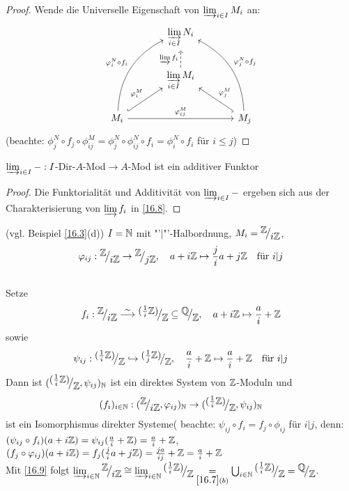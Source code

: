 \begin{proof}
	Wende die Universelle Eigenschaft von $\varinjlim_{i\in I} M_i$ an:
	$$\begin{tikzcd}[column sep = large]
	& \varinjlim\limits_{i\in I} N_i & \\
	& \varinjlim\limits_{i\in I} M_i \arrow[dashed]{u}{\varinjlim f_i}& \\
	M_i \arrow[hook]{ur}{\phi_i^M} \arrow[bend left]{uur}{\phi_i^N \circ f_i} \arrow{rr}{\phi_{ij}^M} & & M_j \arrow[swap, hook]{ul}{\phi_j^M} \arrow[bend right, swap]{uul}{\phi_j^N \circ f_j}
	\end{tikzcd}$$
	(beachte: $\phi_j^N \circ f_j \circ \phi_{ij}^M = \phi_j^N \circ \phi_{ij}^N \circ f_i = \phi_i^N \circ f_i$ für $i\leq j$)
\end{proof}
\begin{fo} \label{16.9}
	$\varinjlim_{i\in I}-:I$-Dir-$A$-Mod$\to A$-Mod ist ein additiver Funktor
\end{fo}
\begin{proof}
	Die Funktorialität und Additivität von $\varinjlim_{i\in I}-$ ergeben sich aus der Charakterisierung von $\varinjlim f_i$ in \ref{16.8}.
\end{proof}
\begin{bsp} \label{16.10}
	(vgl. Beispiel \ref{16.3}(d)) $I=\mathbb{N}$ mit "'$\big | $"'-Halbordnung, $M_i = \QR{\Z}{i\Z}$,$$\phi_{ij}: \QR{\Z}{i\Z} \to \QR{\Z}{j\Z}, \quad  a+i\Z \mapsto \frac{j}{i}a + j \Z \quad \text{für} \ i|j$$\\
	Setze $$f_i: \QR{\Z}{i\Z} \overset{\sim}{\longrightarrow} \QR{(\frac{1}{i} \Z)}{\Z} \subseteq \QR{\Q}{\Z}, \quad a+i \Z \mapsto \frac{a}{i} + \Z $$ sowie $$ \psi_{ij}: \QR{(\frac{1}{i} \Z)}{\Z} \hookrightarrow \QR{(\frac{1}{j} \Z)}{\Z}, \quad \frac{a}{i} + \Z \mapsto \frac{a}{i} + \Z  \quad \text{für} \ i|j$$ 
	Dann ist $ (\QR{(\frac{1}{i} \Z)}{\Z}, \psi_{ij})_{\N} $ ist ein direktes System von $\mathbb{Z}$-Moduln und $$ (f_i)_{i \in \N} : (\QR{\Z}{i \Z}, \phi_{ij})_{\N} \to (\QR{(\frac{1}{i} \Z)}{\Z}, \psi_{ij})_{\N} $$ ist ein Isomorphismus direkter Systeme( beachte: $\psi_{ij} \circ f_i = f_j \circ \phi_{ij} $ für $i|j$, denn: \\
	$(\psi_{ij} \circ f_i)(a + i\mathbb{Z}) = \psi_{ij}(\frac{a}{i} + \mathbb{Z}) = \frac{a}{i} + \mathbb{Z}$,\\
	$(f_j \circ \varphi_{ij})(a + i\mathbb{Z}) = f_j(\frac{j}{i} a + j\mathbb{Z}) = \frac{ja}{ij} + \mathbb{Z} = \frac{a}{i} + \mathbb{Z}$\\
	Mit \ref{16.9} folgt $\varinjlim_{i\in \N} \QR{\Z}{i \Z} \cong \varinjlim_{i\in \N} \QR{(\frac{1}{i} \Z)}{\Z} \underset{\ref{16.7}(b)}{=} \bigcup_{i\in \N} \QR{(\frac{1}{i} \Z)}{\Z} = \QR{\Q}{\Z}$.
\end{bsp}
